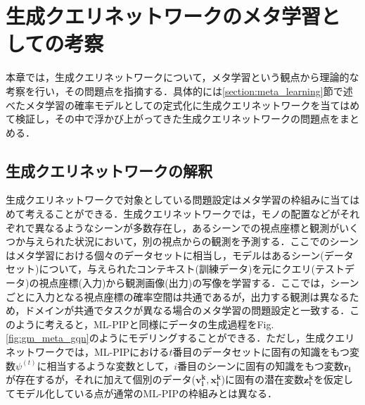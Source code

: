 \chapter{生成クエリネットワークのメタ学習としての考察}
\label{chap:meta_gqn}
本章では，生成クエリネットワークについて，メタ学習という観点から理論的な考察を行い，その問題点を指摘する．具体的には\ref{section:meta_learning}節で述べたメタ学習の確率モデルとしての定式化に生成クエリネットワークを当てはめて検証し，その中で浮かび上がってきた生成クエリネットワークの問題点をまとめる．


\section{生成クエリネットワークの解釈}
\label{section:interpretation}
生成クエリネットワークで対象としている問題設定はメタ学習の枠組みに当てはめて考えることができる．生成クエリネットワークでは，モノの配置などがそれぞれで異なるようなシーンが多数存在し，あるシーンでの視点座標と観測がいくつか与えられた状況において，別の視点からの観測を予測する．ここでのシーンはメタ学習における個々のデータセットに相当し，モデルはあるシーン(データセット)について，与えられたコンテキスト(訓練データ)を元にクエリ(テストデータ)の視点座標(入力)から観測画像(出力)の写像を学習する．ここでは，シーンごとに入力となる視点座標の確率空間は共通であるが，出力する観測は異なるため，ドメインが共通でタスクが異なる場合のメタ学習の問題設定と一致する．このように考えると，ML-PIPと同様にデータの生成過程をFig. \ref{fig:gm_meta_gqn}のようにモデリングすることができる．ただし，生成クエリネットワークでは，ML-PIPにおける$t$番目のデータセットに固有の知識をもつ変数$\psi^{(t)}$に相当するような変数として，$i$番目のシーンに固有の知識をもつ変数$\bm{r_i}$が存在するが，それに加えて個別のデータ($\bm{v_i^k}, \bm{x_i^k}$)に固有の潜在変数$\bm{z_i^k}$を仮定してモデル化している点が通常のML-PIPの枠組みとは異なる．

